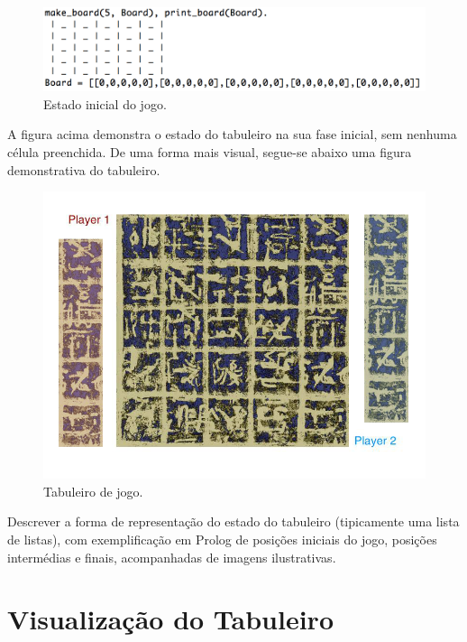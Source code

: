 \documentclass[a4paper]{article}
\begin{document}
\begin{figure}[!htb]
	\centering
	\includegraphics[scale=0.6]{images/make_board.png}
	\caption{Estado inicial do jogo.}
\end{figure}

A figura acima demonstra o estado do tabuleiro na sua fase inicial, sem nenhuma célula preenchida. De uma forma mais visual, segue-se abaixo uma figura demonstrativa do tabuleiro.

\begin{figure}[!htb]
	\centering
	\includegraphics[scale=0.3]{images/board.png}
	\caption{Tabuleiro de jogo.}
\end{figure}

Descrever a forma de representação do estado do tabuleiro (tipicamente uma lista de listas), com exemplificação em Prolog de posições iniciais do jogo, posições intermédias e finais, acompanhadas de imagens ilustrativas.


\section{Visualização do Tabuleiro}
\end{document}

